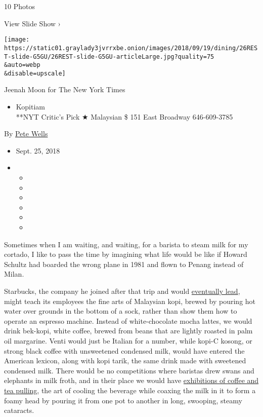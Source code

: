 10 Photos

View Slide Show ›

\texttt{[image: https://static01.graylady3jvrrxbe.onion/images/2018/09/19/dining/26REST-slide-G5GU/26REST-slide-G5GU-articleLarge.jpg?quality=75\\\&auto=webp\\\&disable=upscale]}

Jeenah Moon for The New York Times

\begin{itemize}
\tightlist
\item
  Kopitiam\\
  **NYT Critic's Pick ★ Malaysian \$ 151 East Broadway 646-609-3785
\end{itemize}

By \href{https://www.nytimes3xbfgragh.onion/by/pete-wells}{Pete Wells}

\begin{itemize}
\item
  Sept. 25, 2018
\item
  \begin{itemize}
  \item
  \item
  \item
  \item
  \item
  \item
  \end{itemize}
\end{itemize}

Sometimes when I am waiting, and waiting, for a barista to steam milk
for my cortado, I like to pass the time by imagining what life would be
like if Howard Schultz had boarded the wrong plane in 1981 and flown to
Penang instead of Milan.

Starbucks, the company he joined after that trip and would
\href{https://www.nytimes3xbfgragh.onion/2018/06/04/business/dealbook/starbucks-howard-schultz.html}{eventually
lead}, might teach its employees the fine arts of Malaysian kopi, brewed
by pouring hot water over grounds in the bottom of a sock, rather than
show them how to operate an espresso machine. Instead of white-chocolate
mocha lattes, we would drink bek-kopi, white coffee, brewed from beans
that are lightly roasted in palm oil margarine. Venti would just be
Italian for a number, while kopi-C kosong, or strong black coffee with
unsweetened condensed milk, would have entered the American lexicon,
along with kopi tarik, the same drink made with sweetened condensed
milk. There would be no competitions where baristas drew swans and
elephants in milk froth, and in their place we would have
\href{https://www.youtube.com/watch?v=ij20GFJKJbU}{exhibitions of coffee
and tea pulling}, the art of cooling the beverage while coaxing the milk
in it to form a foamy head by pouring it from one pot to another in
long, swooping, steamy cataracts.

